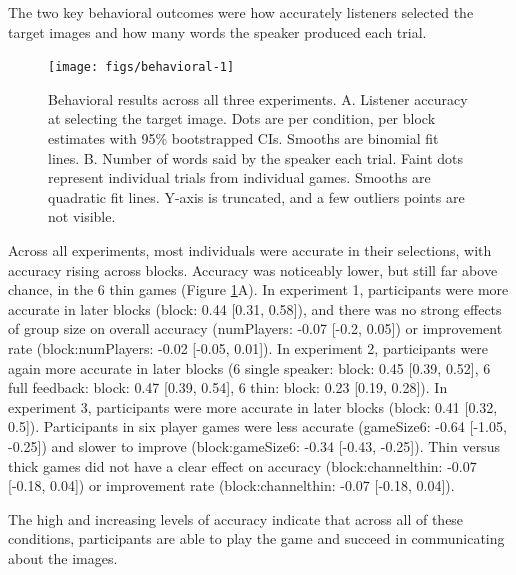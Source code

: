 \documentclass[
  english,
  a4paper,
]{article}
\begin{document}
The two key behavioral outcomes were how accurately listeners selected the target images and how many words the speaker produced each trial.

\begin{figure}[t!]

{\centering \texttt{[image: figs/behavioral-1]} 

}

\caption{Behavioral results across all three experiments. A. Listener accuracy at selecting the target image. Dots are per condition, per block estimates with 95\% bootstrapped CIs. Smooths are binomial fit lines. B. Number of words said by the speaker each trial. Faint dots represent individual trials from individual games. Smooths are quadratic fit lines. Y-axis is truncated, and a few outliers points are not visible. }\label{fig:behavioral}
\end{figure}

Across all experiments, most individuals were accurate in their selections, with accuracy rising across blocks. Accuracy was noticeably lower, but still far above chance, in the 6 thin games (Figure \ref{fig:behavioral}A). In experiment 1, participants were more accurate in later blocks (block: 0.44 {[}0.31, 0.58{]}), and there was no strong effects of group size on overall accuracy (numPlayers: -0.07 {[}-0.2, 0.05{]}) or improvement rate (block:numPlayers: -0.02 {[}-0.05, 0.01{]}). In experiment 2, participants were again more accurate in later blocks (6 single speaker: block: 0.45 {[}0.39, 0.52{]}, 6 full feedback: block: 0.47 {[}0.39, 0.54{]}, 6 thin: block: 0.23 {[}0.19, 0.28{]}). In experiment 3, participants were more accurate in later blocks (block: 0.41 {[}0.32, 0.5{]}). Participants in six player games were less accurate (gameSize6: -0.64 {[}-1.05, -0.25{]}) and slower to improve (block:gameSize6: -0.34 {[}-0.43, -0.25{]}). Thin versus thick games did not have a clear effect on accuracy (block:channelthin: -0.07 {[}-0.18, 0.04{]}) or improvement rate (block:channelthin: -0.07 {[}-0.18, 0.04{]}).

The high and increasing levels of accuracy indicate that across all of these conditions, participants are able to play the game and succeed in communicating about the images.
\end{document}

